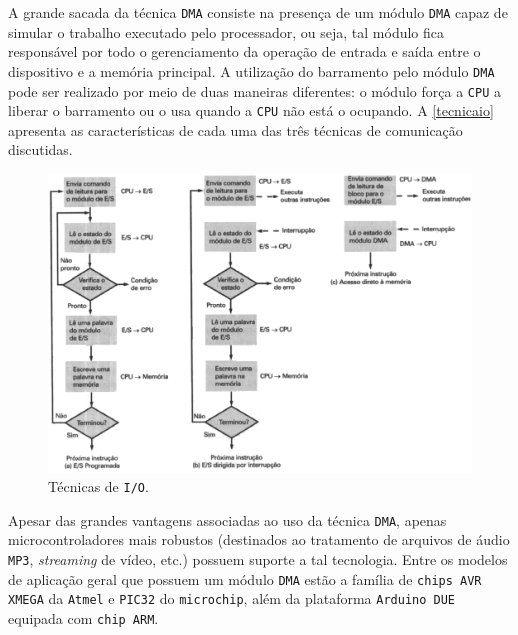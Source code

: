 A grande sacada da técnica \texttt{DMA} consiste na presença de um módulo \texttt{DMA} capaz de simular o trabalho executado pelo processador, ou seja, tal módulo fica responsável por todo o gerenciamento da operação de entrada e saída entre o dispositivo e a memória principal. A utilização do barramento pelo módulo \texttt{DMA} pode ser realizado por meio de duas maneiras diferentes: o módulo força a \texttt{CPU} a liberar o barramento ou o usa quando a \texttt{CPU} não está o ocupando. A \autoref{tecnicaio} apresenta as características de cada uma das três técnicas de comunicação discutidas.

\begin{figure}[h]
	\centering
	\caption{\label{tecnicaio}Técnicas de \texttt{I/O}.}
		\includegraphics[keepaspectratio=true,scale=0.5]{figuras/tec.eps}
\end{figure}

Apesar das grandes vantagens associadas ao uso da técnica \texttt{DMA}, apenas microcontroladores mais robustos (destinados ao tratamento de arquivos de áudio \texttt{MP3}, \textit{streaming} de vídeo, etc.) possuem suporte a tal tecnologia. Entre os modelos de aplicação geral que possuem um módulo \texttt{DMA} estão a família de \texttt{chips AVR XMEGA} da \texttt{Atmel} e \texttt{PIC32} do \texttt{microchip}, além da plataforma \texttt{Arduino DUE} equipada com \texttt{chip ARM}.

